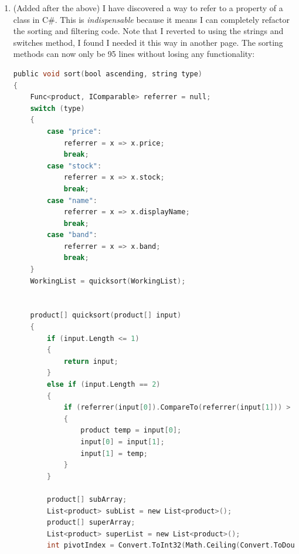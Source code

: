 ﻿\documentclass{article}
\begin{document}
\begin{enumerate}
\begin{lstlisting}[language=C]
                {
                    if (WorkingList[i].band.ToUpper() != value.ToUpper())
                    {
                        filteredList.Add(WorkingList[i]);
                        filteredIndex++;
                    }
                }
                break;
            case filterType.type:
                if (whitelist)
                {
                    if (WorkingList[i].type.ToUpper() == value.ToUpper())
                    {
                        filteredList.Add(WorkingList[i]);
                        filteredIndex++;
                    }
                }
                else
                {
                    if (WorkingList[i].type.ToUpper() != value.ToUpper())
                    {
                        filteredList.Add(WorkingList[i]);
                        filteredIndex++;
                    }
                }
                break;
        }
    }
    WorkingList = filteredList.ToArray();
}
        \end{lstlisting}
        \item (Added after the above) I have discovered a way to refer to a property of a class in C\#.
        This is \textit{indispensable} because it means I can completely refactor the sorting and filtering code.
        Note that I reverted to using the strings and switches method, I found I needed it this way in another page.
        The sorting methods can now only be 95 lines without losing any functionality:
        \begin{lstlisting}[language=C]
public void sort(bool ascending, string type)
{
    Func<product, IComparable> referrer = null;
    switch (type)
    {
        case "price":
            referrer = x => x.price;
            break;
        case "stock":
            referrer = x => x.stock;
            break;
        case "name":
            referrer = x => x.displayName;
            break;
        case "band":
            referrer = x => x.band;
            break;
    }
    WorkingList = quicksort(WorkingList);


    product[] quicksort(product[] input)
    {
        if (input.Length <= 1)
        {
            return input;
        }
        else if (input.Length == 2)
        {
            if (referrer(input[0]).CompareTo(referrer(input[1])) > 0 && ascending || (referrer(input[0]).CompareTo(referrer(input[1])) < 0) && !ascending)
            {
                product temp = input[0];
                input[0] = input[1];
                input[1] = temp;
            }
        }

        product[] subArray;
        List<product> subList = new List<product>();
        product[] superArray;
        List<product> superList = new List<product>();
        int pivotIndex = Convert.ToInt32(Math.Ceiling(Convert.ToDouble(input.Length) / 2)) - 1;


\end{lstlisting}
\end{enumerate}
\end{document}
